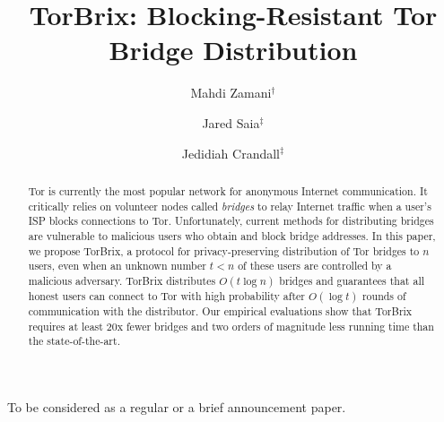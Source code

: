 \documentclass{llncs}
\newcommand{\sfsize}{\fontsize{0.73\baselineskip}{0.73\baselineskip}\selectfont}
\newcommand{\sans}[1]{\textsf{\sfsize \mbox{#1}}}
\newcommand{\brix}{\sans{TorBrix}\xspace}
\begin{document}
	\sloppy

	\title{TorBrix: Blocking-Resistant Tor Bridge Distribution}
	
	\author{Mahdi Zamani$^\dag$ \and Jared Saia$^\ddag$ \and Jedidiah Crandall$^\ddag$}
	
	
	\maketitle

\begin{abstract}


	Tor is currently the most popular network for anonymous Internet communication. It critically relies on volunteer nodes called \emph{bridges} to relay Internet traffic when a user's ISP blocks connections to Tor. 
	Unfortunately, current methods for distributing bridges are vulnerable to malicious users who obtain and block bridge addresses.
	In this paper, we propose \brix, a protocol for privacy-preserving distribution of Tor bridges to $n$ users, even when an unknown number ${t < n}$ of these users are controlled by a malicious adversary. \brix distributes $O(t\log{n})$ bridges and guarantees that all honest users can connect to Tor with high probability after $O(\log{t})$ rounds of communication with the distributor. 
	Our empirical evaluations show that \brix requires at least 20x fewer bridges and two orders of magnitude less running time than the state-of-the-art.
\end{abstract}

\small{To be considered as a regular or a brief announcement paper.}
\end{document}
